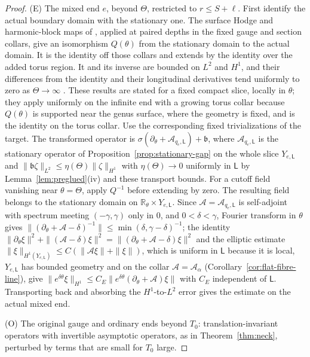\documentclass[11pt]{amsart}
\theoremstyle{definition}
\theoremstyle{remark}
\theoremstyle{plain}
\numberwithin{equation}{section}
\newcommand{\RR}{\mathbb{R}}
\begin{document}
\begin{proof}
(E) The mixed end $e$, beyond $\Theta$, restricted to $r\le S+\ell$.
First identify the actual boundary domain with the stationary one.
The surface Hodge and harmonic-block maps of
\cite[Proposition~5.27]{DFL-mixed}, applied at paired depths in
the fixed gauge and section collars, give an isomorphism
$Q(\theta)$ from the stationary domain to the actual domain.
It is the identity off those collars and extends by the identity
over the added torus region. It and its inverse are bounded on
$L^2$ and $H^1$, and their differences from the identity and their
longitudinal derivatives tend uniformly to zero as
$\Theta\to\infty$ \cite[Lemma~5.67]{DFL-mixed}. These results are stated for a fixed
compact slice, locally in $\theta$; they apply uniformly on the infinite end with a
growing torus collar because $Q(\theta)$ is supported near the genus surface, where the
geometry is fixed, and is the identity on the torus collar.
Use the corresponding fixed trivializations of the target.
The transformed operator is
$\sigma(\partial_\theta+\mathcal A_{q_e,\mathsf L})+\mathfrak b$, where $\mathcal A_{q_e,\mathsf L}$ is the
stationary operator of Proposition~\ref{prop:stationary-gap} on the whole slice
$Y_{e,\mathsf L}$ \cite[Section~4.2.1, (4.16)]{DFL} and $\|\mathfrak b\zeta\|_{L^2}\le\eta(\Theta)\|\zeta\|_{H^1}$ with
$\eta(\Theta)\to0$ uniformly in $\mathsf L$ by
Lemma~\ref{lem:preglued}(iv) and these transport bounds.
For a cutoff field vanishing near $\theta=\Theta$, apply
$Q^{-1}$ before extending by zero. The resulting field belongs
to the stationary domain on $\RR_\theta\times Y_{e,\mathsf L}$.
Since $\mathcal A=\mathcal A_{q_e,\mathsf L}$ is self-adjoint with
spectrum meeting $(-\gamma,\gamma)$ only in $0$, and $0<\delta<\gamma$, Fourier transform in
$\theta$ gives $\|(\partial_\theta+\mathcal A-\delta)^{-1}\|\le\min(\delta,\gamma-\delta)^{-1}$; the identity
$\|\partial_\theta\xi\|^2+\|(\mathcal A-\delta)\xi\|^2=\|(\partial_\theta+\mathcal A-\delta)\xi\|^2$ and the elliptic
estimate $\|\xi\|_{H^1(Y_{e,\mathsf L})}\le C(\|\mathcal A\xi\|+\|\xi\|)$, which is uniform in $\mathsf L$
because it is local, $Y_{e,\mathsf L}$ has bounded geometry and on the collar
$\mathcal A=\mathcal A_\alpha$ (Corollary~\ref{cor:flat-fibre-line}), give
$\|e^{\delta\theta}\xi\|_{H^1}\le C_E\|e^{\delta\theta}(\partial_\theta+\mathcal A)\xi\|$ with $C_E$ independent of
$\mathsf L$. Transporting back and absorbing the
$H^1$-to-$L^2$ error gives the estimate on the actual mixed end.

(O) The original gauge and ordinary ends beyond $T_0$: translation-invariant
operators with invertible asymptotic operators, as in
Theorem~\ref{thm:neck}, perturbed by terms that are small for $T_0$ large.


\end{proof}
\end{document}

